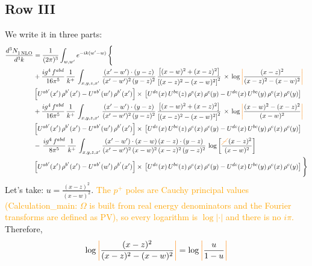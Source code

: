 \documentclass[9pt]{article}
\numberwithin{equation}{section}
\begin{document}
\subsection{Row III}
We write it in three parts:
\begin{align}
   \frac{d^{3}N_{1\,\rm NLO}^{\rm}}{d^{3}k}  & =  \frac{1}{(2\pi)^{3}}  \int_{w, w^\prime} e^{-ik(w^\prime-w)}\, \Bigg\{\notag \\
&  +\frac{ig^{4}\,f^{abd}}{16\pi^{5}}\, \frac{1}{k^{+}}\,\int_{x,y,z,x'}\, \frac{(x'-w')\cdot (y-z)}{(x'-w')^{2}\,(y-z)^{2}}\, \frac{\left[(x-w)^{2}+(x-z)^{2}\right]}{\left[(x-z)^{2}-(x-w)^{2}\right]^{2}}\, \times\, \log{\textcolor{orange}{\left|\textcolor{black}{\frac{(x-z)^{2}}{(x-z)^{2}-(x-w)^{2}}}\right|}}\notag \\ & \left[U^{ab'}(x')\,\rho^{b'}(x')-U^{ab'}(w')\, \rho^{b'}(x')\right]\times\, \left[U^{de}(x)\,U^{bc}(z)\, \rho^{e}(x)\,\rho^{c}(y)-U^{de}(x)\,U^{bc}(y)\,\rho^{e}(x)\,\rho^{c}(y)\right] \notag \\
&  +\frac{ig^{4}\,f^{abd}}{16\pi^{5}}\, \frac{1}{k^{+}}\,\int_{x,y,z,x'}\, \frac{(x'-w')\cdot (y-z)}{(x'-w')^{2}\,(y-z)^{2}}\, \frac{\left[(x-w)^{2}+(x-z)^{2}\right]}{\left[(x-z)^{2}-(x-w)^{2}\right]^{2}}\, \times\, \log{\textcolor{orange}{\left|\textcolor{black}{\frac{(x-w)^{2}-(x-z)^{2}}{(x-w)^{2}}}\right|}}\notag \\ & \left[U^{ab'}(x')\,\rho^{b'}(x')-U^{ab'}(w')\, \rho^{b'}(x')\right]\times\, \left[U^{de}(x)\,U^{bc}(z)\, \rho^{e}(x)\,\rho^{c}(y)-U^{de}(x)\,U^{bc}(y)\,\rho^{e}(x)\,\rho^{c}(y)\right] \notag \\
&-\, \frac{ig^{4}\,f^{abd}}{8\pi^{5}}\,\frac{1}{k^{+}}\,\int_{x,y,z,x'}\frac{(x'-w')\cdot (x-w)\, (x-z)\cdot (y-z)}{(x'-w')^{2}\, (x-w)^{2}\, (x-z)^{2}\, (y-z)^{2}}\,\log{\left[\frac{\textcolor{orange}{\cancel{-}}\,(x-z)^{2}}{(x-w)^{2}}\right]} \notag \\ & \left[U^{ab'}(x')\,\rho^{b'}(x')-U^{ab'}(w')\, \rho^{b'}(x')\right]\times\, \left[U^{de}(x)\,U^{bc}(z)\, \rho^{e}(x)\,\rho^{c}(y)-U^{de}(x)\,U^{bc}(y)\,\rho^{e}(x)\,\rho^{c}(y)\right]\Bigg\}
\end{align}
Let's take: $u = \frac{(x-z)^{2}}{(x-w)^{2}}$. \textcolor{orange}{The $p^{+}$ poles are Cauchy principal values (Calculation\_main: $\Omega$ is built from real energy denominators and the Fourier transforms are defined as PV), so every logarithm is $\log|\cdot|$ and there is no $i\pi$.} Therefore,
$$ \log{\textcolor{orange}{\left|\textcolor{black}{\frac{(x-z)^{2}}{(x-z)^{2}-(x-w)^{2}}}\right|}} = \log{\textcolor{orange}{\left|\textcolor{black}{\frac{u}{1-u}}\right|}}$$
\end{document}
